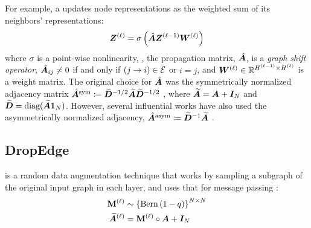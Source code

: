 For example, a  \cite{kipf2017gcn} updates node representations as the weighted sum of its neighbors' representations: 
\begin{align}
    \bm{Z}^{\left(\ell\right)} = \sigma\left(\hat{\bm{A}} \bm{Z}^{\left(\ell-1\right)}\bm{W}^{\left(\ell\right)}\right)
\end{align}
where $\sigma$ is a point-wise nonlinearity, \eg {}, the propagation matrix, $\hat{\bm{A}}$, is a \textit{graph shift operator}, \ie $\hat{\bm{A}}_{ij} \neq 0$ if and only if $\left(j \to i\right) \in \mathcal{E}$ or $i=j$, and $\bm{W}^{\left(\ell\right)} \in \mathbb{R}^{H^{\left(\ell-1\right)}\times H^{\left(\ell\right)}}$ is a weight matrix. The original choice for $\hat{\bm{A}}$ was the symmetrically normalized adjacency matrix $\hat{\bm{A}}^{\text{sym}} \coloneqq \widetilde{\bm{D}}^{-1/2} \widetilde{\bm{A}} \widetilde{\bm{D}}^{-1/2}$ \cite{kipf2017gcn}, where $\widetilde{\bm{A}} = \bm{A} + \bm{I}_N$ and $\widetilde{\bm{D}} = \text{diag}(\widetilde{\bm{A}}\mathbf{1}_N)$. However, several influential works have also used the asymmetrically normalized adjacency, $\hat{\bm{A}}^{\text{asym}} \coloneqq \widetilde{\bm{D}}^{-1} \widetilde{\bm{A}}$ \cite{hamilton2017ppi,schlichtkrull2017modelingrelationaldatagraph,Li_Han_Wu_2018}.

\subsection{DropEdge}
\label{sec:drop-edge}

 is a random data augmentation technique that works by sampling a subgraph of the original input graph in each layer, and uses that for message passing \cite{rong2020dropedge}:
\begin{align}
\begin{split}
    \mathbf{M}^{\left(\ell\right)} &\sim \left\{\text{Bern}\left(1-q\right)\right\}^{N\times N} \\
    \widetilde{\bm{A}}^{\left(\ell\right)} &= \mathbf{M}^{\left(\ell\right)} \circ \bm{A} + \bm{I}_N
\end{split}
\end{align}

